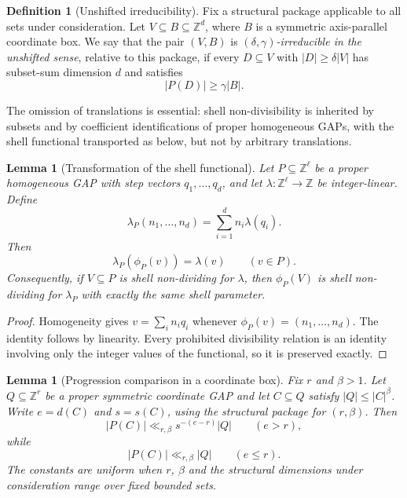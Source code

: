 \documentclass[11pt,reqno]{amsart}
\newtheorem{lemma}[theorem]{Lemma}
\theoremstyle{definition}
\newtheorem{definition}[theorem]{Definition}
\theoremstyle{remark}
\newcommand{\Z}{\mathbb Z}
\begin{document}
\begin{definition}[Unshifted irreducibility]
Fix a structural package applicable to all sets under consideration.  Let
$V\subseteq B\subseteq\Z^d$, where $B$ is a symmetric axis-parallel
coordinate box.  We say that the pair $(V,B)$ is
\emph{$(\delta,\gamma)$-irreducible in the unshifted sense}, relative to
this package, if every $D\subseteq V$ with $|D|\ge\delta|V|$ has
subset-sum dimension $d$ and satisfies
\[
 |P(D)|\ge\gamma|B|.
\]
\end{definition}

The omission of translations is essential: shell non-divisibility is inherited
by subsets and by coefficient identifications of proper homogeneous GAPs, with
the shell functional transported as below, but not by arbitrary translations.

\begin{lemma}[Transformation of the shell functional]
\label{lem:functional-transform}
Let $P\subseteq\Z^\ell$ be a proper homogeneous GAP with step vectors $q_1,\dots,q_d$, and let $\lambda:\Z^\ell\to\Z$ be integer-linear.  Define
\[
 \lambda_P(n_1,\dots,n_d)=\sum_{i=1}^d n_i\lambda(q_i).
\]
Then
\[
 \lambda_P(\phi_P(v))=\lambda(v)\qquad(v\in P).
\]
Consequently, if $V\subseteq P$ is shell non-dividing for $\lambda$, then $\phi_P(V)$ is shell non-dividing for $\lambda_P$ with exactly the same shell parameter.
\end{lemma}

\begin{proof}
Homogeneity gives $v=\sum_i n_iq_i$ whenever $\phi_P(v)=(n_1,\dots,n_d)$.  The identity follows by linearity.  Every prohibited divisibility relation is an identity involving only the integer values of the functional, so it is preserved exactly.
\end{proof}

\begin{lemma}[Progression comparison in a coordinate box]
\label{lem:progression-comparison}
Fix $r$ and $\beta>1$.  Let $Q\subseteq\Z^r$ be a proper symmetric
coordinate GAP and let $C\subseteq Q$ satisfy $|Q|\le|C|^\beta$.  Write
$e=d(C)$ and $s=s(C)$, using the structural package for $(r,\beta)$.  Then
\[
 |P(C)|\ll_{r,\beta} s^{-(e-r)}|Q|\qquad(e>r),
\]
while
\[
 |P(C)|\ll_{r,\beta} |Q|\qquad(e\le r).
\]
The constants are uniform when $r$, $\beta$ and the structural dimensions
under consideration range over fixed bounded sets.
\end{lemma}
\end{document}
